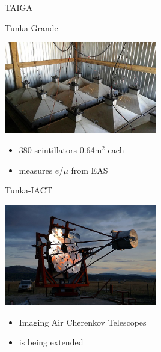 \begin{frame}{TAIGA}
\vspace{-1ex}
\begin{minipage}[t]{0.48\textwidth}
  \begin{block}{\small Tunka-Grande}
    \parbox[c][0.21\textheight][t]{0.43\textwidth}{
      \includegraphics[width=0.50\textwidth]{pics/Hiller_Roman-005.jpg}
    }
    \hfill
    \parbox[c][0.21\textheight][t]{0.55\textwidth}{
      \begin{itemize}
        \setlength{\itemsep}{0pt}
        \item 380 scintillators 0.64m$^2$ each
        \item measures $e$/$\mu$ from EAS
      \end{itemize}
    }
  \end{block}
\end{minipage}
\hfill
\begin{minipage}[t]{0.48\textwidth}
  \begin{block}{\small Tunka-IACT}
    \parbox[c][0.21\textheight][t]{0.43\textwidth}{
      \includegraphics[width=0.50\textwidth]{pics/Tunka-Iact.jpg}
    }
    \hfill
    \parbox[c][0.21\textheight][t]{0.55\textwidth}{
      \begin{itemize}
        \setlength{\itemsep}{0pt}
        \item Imaging Air Cherenkov Telescopes
        \item is being extended
      \end{itemize}
    }
  \end{block}
\end{minipage}
\end{frame}

%
%
